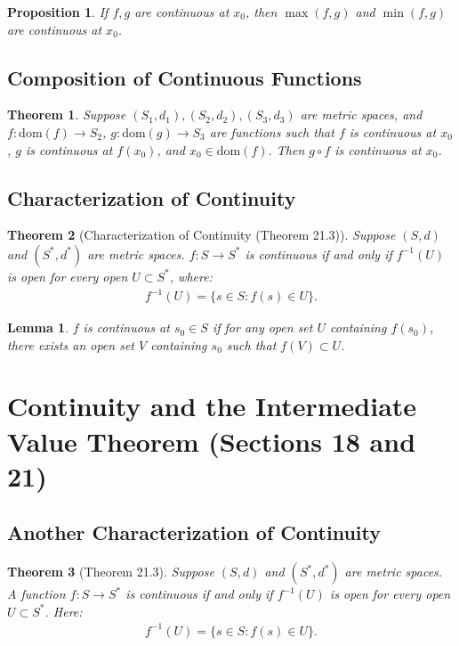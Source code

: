 \documentclass[9pt]{article}
\theoremstyle{definition}
\theoremstyle{plain}
\newtheorem{theorem}{Theorem}
\newtheorem{proposition}{Proposition}
\newtheorem{lemma}{Lemma}
\begin{document}
\begin{proposition}
If $ f, g $ are continuous at $ x_0 $, then $ \max(f, g) $ and $ \min(f, g) $ are continuous at $ x_0 $.
\end{proposition}

\subsection*{Composition of Continuous Functions}
\begin{theorem}
Suppose $ (S_1, d_1), (S_2, d_2), (S_3, d_3) $ are metric spaces, and $ f : \text{dom}(f) \to S_2 $, $ g : \text{dom}(g) \to S_3 $ are functions such that $ f $ is continuous at $ x_0 $, $ g $ is continuous at $ f(x_0) $, and $ x_0 \in \text{dom}(f) $. Then $ g \circ f $ is continuous at $ x_0 $.
\end{theorem}

\subsection*{Characterization of Continuity}
\begin{theorem}[Characterization of Continuity (Theorem 21.3)]
Suppose $ (S, d) $ and $ (S^*, d^*) $ are metric spaces. $ f : S \to S^* $ is continuous if and only if $ f^{-1}(U) $ is open for every open $ U \subset S^* $, where:
\begin{align}
f^{-1}(U) = \{s \in S : f(s) \in U\}.
\end{align}
\end{theorem}

\begin{lemma}
$ f $ is continuous at $ s_0 \in S $ if for any open set $ U $ containing $ f(s_0) $, there exists an open set $ V $ containing $ s_0 $ such that $ f(V) \subset U $.
\end{lemma}
\section*{Continuity and the Intermediate Value Theorem (Sections 18 and 21)}

\subsection*{Another Characterization of Continuity}
\begin{theorem}[Theorem 21.3]
Suppose $ (S, d) $ and $ (S^*, d^*) $ are metric spaces. A function $ f : S \to S^* $ is continuous if and only if $ f^{-1}(U) $ is open for every open $ U \subset S^* $. Here:
\begin{align}
f^{-1}(U) = \{s \in S : f(s) \in U\}.
\end{align}
\end{theorem}
\end{document}
